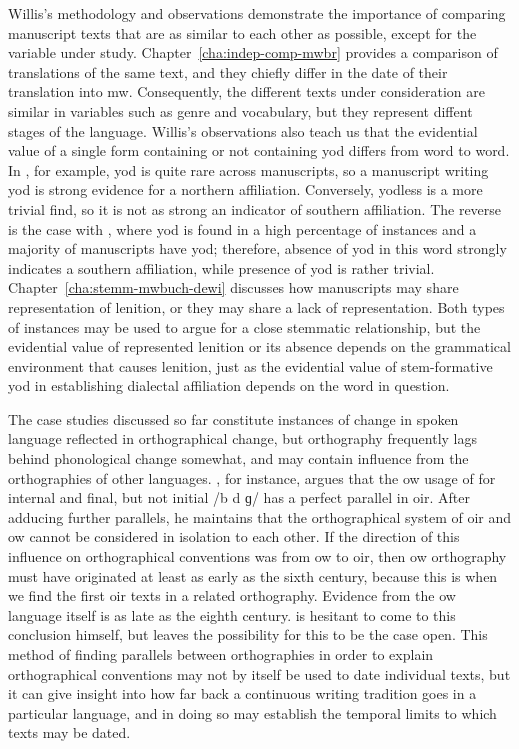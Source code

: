 Willis's methodology and observations demonstrate the importance of comparing  manuscript texts that are as similar to each other as possible, except for the variable under study. Chapter~\ref{cha:indep-comp-mwbr} provides a comparison of translations of the same text, and they chiefly differ in the date of their translation into \gls{mw}. Consequently, the different texts under consideration are similar in variables such as genre and vocabulary, but they represent diffent stages of the language. Willis's observations also teach us that the evidential value of a single form containing or not containing yod  differs from word to word. In , for example, yod is quite rare across manuscripts, so a manuscript writing yod is strong evidence for a northern affiliation. Conversely, yodless  is a more trivial find, so it is not as strong an indicator of southern affiliation. The reverse is the case with , where yod is found in a high percentage of instances and a majority of manuscripts have yod; therefore, absence of yod in this word strongly indicates a southern affiliation, while presence of yod is rather trivial. Chapter~\ref{cha:stemm-mwbuch-dewi} discusses how manuscripts may share representation of lenition, or they may share a lack of representation. Both types of  instances may be used to argue for a close stemmatic relationship, but the evidential value of represented lenition or its absence depends on the grammatical environment that causes lenition, just as the evidential value of stem-formative yod in establishing dialectal affiliation depends on the word in question.

The case studies discussed so far constitute instances of change in spoken language reflected in orthographical change, but orthography frequently lags behind phonological change somewhat, and may contain influence from the orthographies of other languages. \Textcite{Wat_Pointssimilarity65}, for instance, argues that the \gls{ow} usage of  for internal and final, but not initial /b d ɡ/ has a perfect parallel in \gls{oir}. After adducing further parallels, he maintains that the orthographical system of \gls{oir} and \gls{ow} cannot be considered in isolation to each other. If the direction of this influence on orthographical conventions was from \gls{ow} to \gls{oir}, then  \gls{ow} orthography must have originated at least as early as the sixth century, because this is when we find the first \gls{oir} texts in a related orthography. Evidence from the \gls{ow} language itself is as late as the eighth century. \Textcite[141]{Wat_Pointssimilarity65} is hesitant to come to this conclusion himself, but leaves the possibility for this to be the case open. This method of finding parallels between orthographies in order to explain orthographical conventions may not by itself be used to date individual texts, but it can give insight into how far back a continuous writing tradition goes in a particular language, and in doing so may establish the temporal limits to which texts may be dated. 

